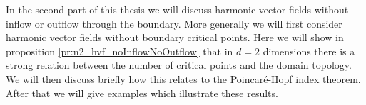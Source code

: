 In the second part of this thesis we will discuss harmonic vector fields without
inflow or outflow through the boundary.
More generally we will first consider harmonic vector fields without boundary critical points.
Here we will show in proposition \ref{pr:n2_hvf_noInflowNoOutflow} that in $d=2$ dimensions there is a strong relation between the 
number of critical points and the domain topology.
We will then discuss briefly how this relates to the Poincaré-Hopf index theorem.
After that we will give examples which illustrate these results.




